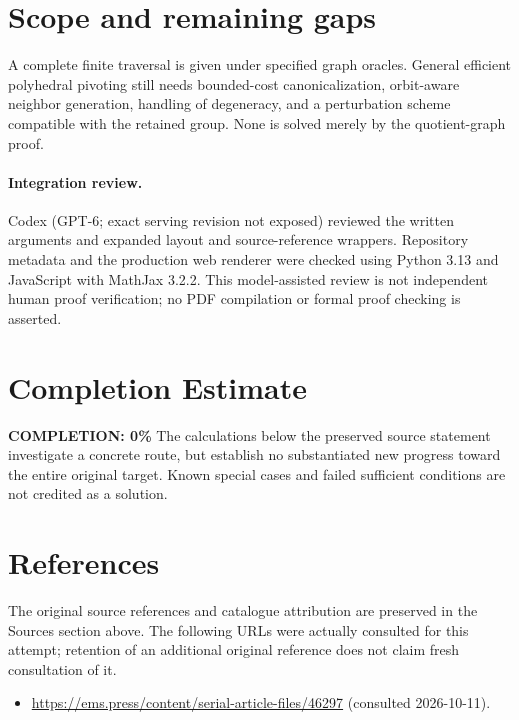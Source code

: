 \documentclass[11pt]{article}
\begin{document}
\section{Scope and remaining gaps}
A complete finite traversal is given under specified graph oracles. General efficient polyhedral pivoting still needs bounded-cost canonicalization, orbit-aware neighbor generation, handling of degeneracy, and a perturbation scheme compatible with the retained group. None is solved merely by the quotient-graph proof.
\paragraph{Integration review.} Codex (GPT-6; exact serving revision not exposed) reviewed the written arguments and expanded layout and source-reference wrappers. Repository metadata and the production web renderer were checked using Python 3.13 and JavaScript with MathJax 3.2.2. This model-assisted review is not independent human proof verification; no PDF compilation or formal proof checking is asserted.

\section{Completion Estimate}
\noindent\textbf{COMPLETION: 0\%}
The calculations below the preserved source statement investigate a concrete route,
but establish no substantiated new progress toward the entire original target.
Known special cases and failed sufficient conditions are not credited as a solution.
\section{References}
The original source references and catalogue attribution are preserved in the
Sources section above. The following URLs were actually consulted for this attempt;
retention of an additional original reference does not claim fresh consultation of it.
\begin{itemize}
\item \url{https://ems.press/content/serial-article-files/46297} (consulted 2026-10-11). 
\end{itemize}
\end{document}
